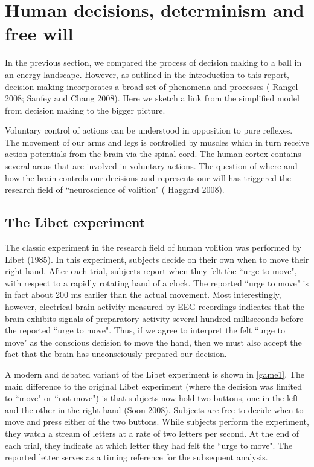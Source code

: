 \documentclass[12pt,hyperref,a4paper,UTF8]{ctexart}
\begin{document}
\section{Human decisions, determinism and free will}

In the previous section, we compared the process of decision making to a ball in an energy landscape. However, as outlined in the introduction to this report, decision making incorporates a broad set of phenomena and processes (\cite{Rangel 2008} Rangel 2008; \cite{Sanfey and Chang 2008} Sanfey and Chang 2008). Here we sketch a link from the simplified model from decision making to the bigger picture.

Voluntary control of actions can be understood in opposition to pure reflexes. The movement of our arms and legs is controlled by muscles which in turn receive action potentials from the brain via the spinal cord. The human cortex contains several areas that are involved in voluntary actions. The question of where and how the brain controls our decisions and represents our will has triggered the research field of ``neuroscience of volition"  (\cite{Haggard 2008} Haggard 2008).

\subsection{The Libet experiment}

The classic experiment in the research field of human volition was performed by Libet (1985). In this experiment, subjects decide on their own when to move their right hand. After each trial, subjects report when they felt the ``urge to move", with respect to a rapidly rotating hand of a clock. The reported ``urge to move" is in fact about 200 ms earlier than the actual movement. Most interestingly, however, electrical brain activity measured by EEG recordings indicates that the brain exhibits signals of preparatory activity several hundred milliseconds before the reported ``urge to move". Thus, if we agree to interpret the felt ``urge to move" as the conscious decision to move the hand, then we must also accept the fact that the brain has unconsciously prepared our decision.

A modern and debated variant of the Libet experiment is shown in \autoref{game1}. The main difference to the original Libet experiment (where the decision was limited to ``move" or ``not move") is that subjects now hold two buttons, one in the left and the other in the right hand (\cite{Soon 2008}Soon 2008). Subjects are free to decide when to move and press either of the two buttons. While subjects perform the experiment, they watch a stream of letters at a rate of two letters per second. At the end of each trial, they indicate at which letter they had felt the ``urge to move". The reported letter serves as a timing reference for the subsequent analysis.
\end{document}
